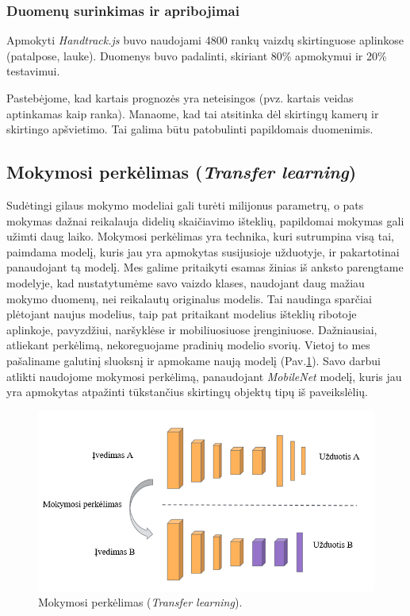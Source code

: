 \documentclass{VUMIFInfKursinis}
\begin{document}
\newpage

\subsubsection{Duomenų surinkimas ir apribojimai}

Apmokyti \textit{Handtrack.js} buvo naudojami 4800 rankų vaizdų skirtinguose aplinkose (patalpose, lauke). Duomenys buvo padalinti, skiriant 80\% apmokymui ir 20\% testavimui.\cite{11}
\par
Pastebėjome, kad kartais prognozės yra neteisingos (pvz. kartais veidas aptinkamas kaip ranka). Manaome, kad tai atsitinka dėl skirtingų kamerų ir skirtingo apšvietimo. Tai galima būtu patobulinti papildomais duomenimis.

\subsection{Mokymosi perkėlimas (\textit{Transfer learning})}

Sudėtingi gilaus mokymo modeliai gali turėti milijonus parametrų, o pats mokymas dažnai reikalauja didelių skaičiavimo išteklių, papildomai mokymas gali užimti daug laiko. Mokymosi perkėlimas yra technika, kuri sutrumpina visą tai, paimdama modelį, kuris jau yra apmokytas susijusioje užduotyje, ir pakartotinai panaudojant tą modelį. Mes galime pritaikyti esamas žinias iš anksto parengtame modelyje, kad nustatytumėme savo vaizdo klases, naudojant daug mažiau mokymo duomenų, nei reikalautų originalus modelis. Tai naudinga sparčiai plėtojant naujus modelius, taip pat pritaikant modelius išteklių ribotoje aplinkoje, pavyzdžiui, naršyklėse ir mobiliuosiuose įrenginiuose. Dažniausiai, atliekant perkėlimą, nekoreguojame pradinių modelio svorių. Vietoj to mes pašaliname galutinį sluoksnį ir apmokame naują modelį (Pav.\ref{fig:transfer_learning}). Savo darbui atlikti naudojome mokymosi perkėlimą, panaudojant \textit{MobileNet} modelį, kuris jau yra apmokytas atpažinti tūkstančius skirtingų objektų tipų iš paveikslėlių.\cite{9}

\begin{figure}[h!]
\centering
  \includegraphics[scale=0.7]{img/TransferLearning.PNG}
  \caption{Mokymosi perkėlimas (\textit{Transfer learning}).}
  \label{fig:transfer_learning}
\end{figure}
\end{document}
